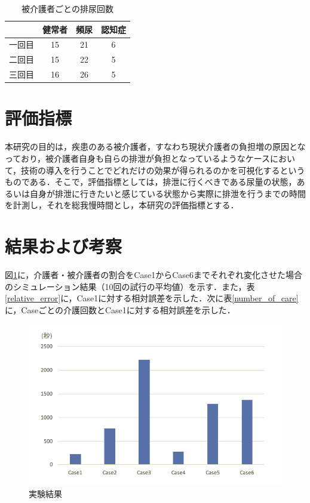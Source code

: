 \begin{table}[htb]
  \caption[被介護者ごとの排尿回数]{被介護者ごとの排尿回数}
  \label{number_of_urination}
  \centering
  \begin{tabular}{r|c|c|c}
     & 健常者 & 頻尿 & 認知症 \\ \hline
    一回目 & 15 & 21 & 6 \\
    二回目 & 15 & 22 & 5 \\
    三回目 & 16 & 26 & 5 \\
    \end{tabular}
\end{table}

\section{評価指標}

本研究の目的は，疾患のある被介護者，すなわち現状介護者の負担増の原因となっており，被介護者自身も自らの排泄が負担となっているようなケースにおいて，技術の導入を行うことでどれだけの効果が得られるのかを可視化するというものである．そこで，評価指標としては，排泄に行くべきである尿量の状態，あるいは自身が排泄に行きたいと感じている状態から実際に排泄を行うまでの時間を計測し，それを総我慢時間とし，本研究の評価指標とする．

\section{結果および考察}

図\ref{result_v1}に，介護者・被介護者の割合をCase1からCase6までそれぞれ変化させた場合のシミュレーション結果（10回の試行の平均値）を示す．また，表\ref{relative_error}に，Case1に対する相対誤差を示した．次に表\ref{number_of_care}に，Caseごとの介護回数とCase1に対する相対誤差を示した．

\begin{figure}[htb]
\begin{center}
 \includegraphics[scale=0.5]{figures/result_1.png}
 \caption[実験結果]{実験結果 \label{result_v1}}
\end{center}
\end{figure}

